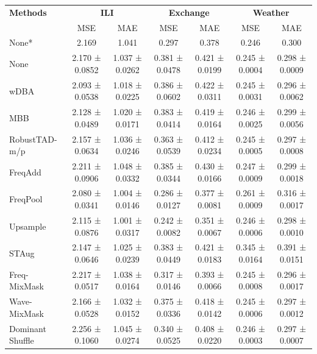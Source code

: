 \begin{table}[h!]
\centering
\vspace{0.2cm}
\renewcommand{\arraystretch}{1.2}
\begin{adjustbox}{max width=\textwidth}
\begin{tabular}{l|cc|cc|cc}
    \toprule
    \textbf{Methods} & \multicolumn{2}{c|}{\textbf{ILI}} & \multicolumn{2}{c|}{\textbf{Exchange}} & \multicolumn{2}{c}{\textbf{Weather}} \\
    & MSE & MAE & MSE & MAE & MSE & MAE \\
    \midrule
    None*        & 2.169 & 1.041 & 0.297 & 0.378 & 0.246 & 0.300 \\
            None          & 2.170 ± 0.0852 & 1.037 ± 0.0262 & 0.381 ± 0.0478 & 0.421 ± 0.0199 & 0.245 ± 0.0004 & 0.298 ± 0.0009 \\
        wDBA           & 2.093 ± 0.0538 & 1.018 ± 0.0225 & 0.386 ± 0.0602 & 0.422 ± 0.0311 & \cellcolor{secondcolor}0.245 ± 0.0031 & \cellcolor{secondcolor}0.296 ± 0.0062 \\
        MBB           & 2.128 ± 0.0489 & 1.020 ± 0.0171 & 0.383 ± 0.0414 & 0.419 ± 0.0164 & 0.246 ± 0.0025 & 0.299 ± 0.0056 \\
        RobustTAD-m/p   & 2.157 ± 0.0634 & 1.036 ± 0.0246 & 0.363 ± 0.0539 & 0.412 ± 0.0234 & 0.245 ± 0.0005 & 0.297 ± 0.0008 \\
        FreqAdd      & 2.211 ± 0.0906 & 1.048 ± 0.0332 & 0.385 ± 0.0344 & 0.430 ± 0.0166 & 0.247 ± 0.0009 & 0.299 ± 0.0018 \\
        FreqPool      & \cellcolor{secondcolor}2.080 ± 0.0341 & 1.004 ± 0.0146 & 0.286 ± 0.0127 & 0.377 ± 0.0081 & 0.261 ± 0.0009 & 0.316 ± 0.0017 \\
        Upsample      & 2.115 ± 0.0876 & \cellcolor{secondcolor}1.001 ± 0.0317 & \cellcolor{secondcolor}0.242 ± 0.0082 & \cellcolor{secondcolor}0.351 ± 0.0067 & 0.246 ± 0.0006 & 0.298 ± 0.0010 \\
        STAug        & 2.147 ± 0.0646 & 1.025 ± 0.0239 & 0.383 ± 0.0449 & 0.421 ± 0.0183 & 0.345 ± 0.0164 & 0.391 ± 0.0151 \\
        Freq-MixMask & 2.217 ± 0.0517 & 1.038 ± 0.0164 & 0.317 ± 0.0146 & 0.393 ± 0.0066 & 0.245 ± 0.0008 & 0.296 ± 0.0017 \\
        Wave-MixMask  & 2.166 ± 0.0528 & 1.032 ± 0.0152 & 0.375 ± 0.0336 & 0.418 ± 0.0142 & 0.245 ± 0.0006 & 0.297 ± 0.0012 \\
        Dominant Shuffle  & 2.256 ± 0.1060 & 1.045 ± 0.0274 & 0.340 ± 0.0525 & 0.408 ± 0.0220 & 0.246 ± 0.0003 & 0.297 ± 0.0007 \\

\end{tabular}
\end{adjustbox}
\end{table}
